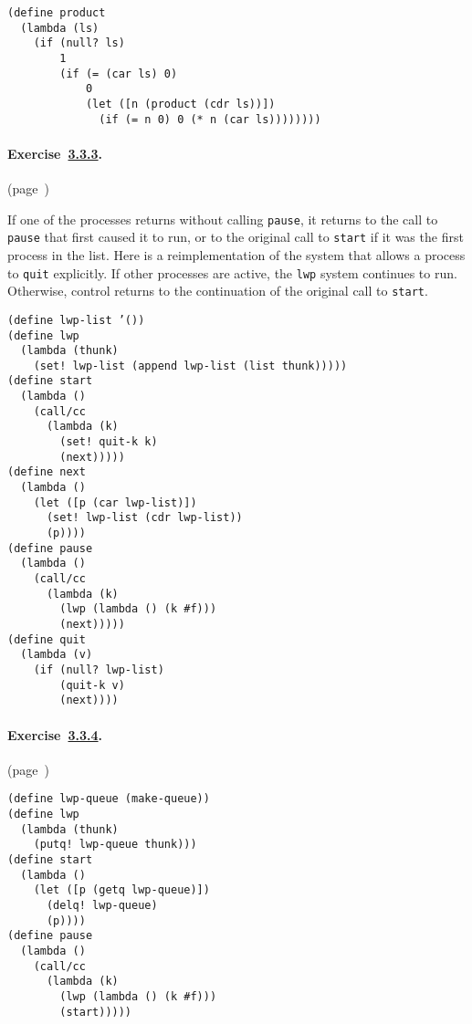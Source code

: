   
\begin{alltt}
 (define product
   (lambda (ls)
     (if (null? ls)
         1
         (if (= (car ls) 0)
             0
             (let ([n (product (cdr ls))])
               (if (= n 0) 0 (* n (car ls))))))))
\end{alltt}



\paragraph{Exercise \hyperref[further_g72]{3.3.3}. }(page \pageref{further_s68})

  If one of the processes returns without calling \texttt{pause}, it returns to the call to \texttt{pause} that first caused it to run, or to the original call to \texttt{start} if it was the first process in the list. Here is a reimplementation of the system that allows a process to \texttt{quit} explicitly. If other processes are active, the \texttt{lwp} system continues to run. Otherwise, control returns to the continuation of the original call to \texttt{start}. 
\begin{alltt}
(define lwp-list '())
 (define lwp
   (lambda (thunk)
     (set! lwp-list (append lwp-list (list thunk)))))
 (define start
   (lambda ()
     (call/cc
       (lambda (k)
         (set! quit-k k)
         (next)))))
 (define next
   (lambda ()
     (let ([p (car lwp-list)])
       (set! lwp-list (cdr lwp-list))
       (p))))
 (define pause
   (lambda ()
     (call/cc
       (lambda (k)
         (lwp (lambda () (k \#{}f)))
         (next)))))
 (define quit
   (lambda (v)
     (if (null? lwp-list)
         (quit-k v)
         (next))))
\end{alltt}



\paragraph{Exercise \hyperref[further_g73]{3.3.4}. }(page \pageref{further_s69})

  
\begin{alltt}
 (define lwp-queue (make-queue))
 (define lwp
   (lambda (thunk)
     (putq! lwp-queue thunk)))
 (define start
   (lambda ()
     (let ([p (getq lwp-queue)])
       (delq! lwp-queue)
       (p))))
 (define pause
   (lambda ()
     (call/cc
       (lambda (k)
         (lwp (lambda () (k \#{}f)))
         (start)))))
\end{alltt}



